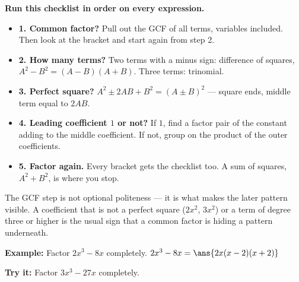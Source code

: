 \documentclass[12pt]{article}
\begin{document}

\begin{formulabox}
\textbf{Run this checklist in order on every expression.}
\begin{itemize}[leftmargin=0.8cm, itemsep=1pt, topsep=2pt]
\item \textbf{1. Common factor?} Pull out the GCF of all terms, variables
included. Then look at the bracket and start again from step 2.
\item \textbf{2. How many terms?} Two terms with a minus sign: difference of
squares, $A^2 - B^2 = (A - B)(A + B)$. Three terms: trinomial.
\item \textbf{3. Perfect square?} $A^2 \pm 2AB + B^2 = (A \pm B)^2$ --- square
ends, middle term equal to $2AB$.
\item \textbf{4. Leading coefficient $1$ or not?} If $1$, find a factor pair of
the constant adding to the middle coefficient. If not, group on the product of
the outer coefficients.
\item \textbf{5. Factor again.} Every bracket gets the checklist too. A sum of
squares, $A^2 + B^2$, is where you stop.
\end{itemize}
\end{formulabox}


\begin{formulabox}
The GCF step is not optional politeness --- it is what makes the later pattern
visible. A coefficient that is not a perfect square ($2x^2$, $3x^2$) or a term
of degree three or higher is the usual sign that a common factor is hiding a
pattern underneath.
\end{formulabox}

\begin{examplebox}
\textbf{Example:} Factor $2x^3 - 8x$ completely.
$2x^3 - 8x = \ans{2x(x-2)(x+2)}$
\end{examplebox}

\begin{tryitbox}
\textbf{Try it:} Factor $3x^3 - 27x$ completely.\\[2pt]
\end{tryitbox}
\end{document}
